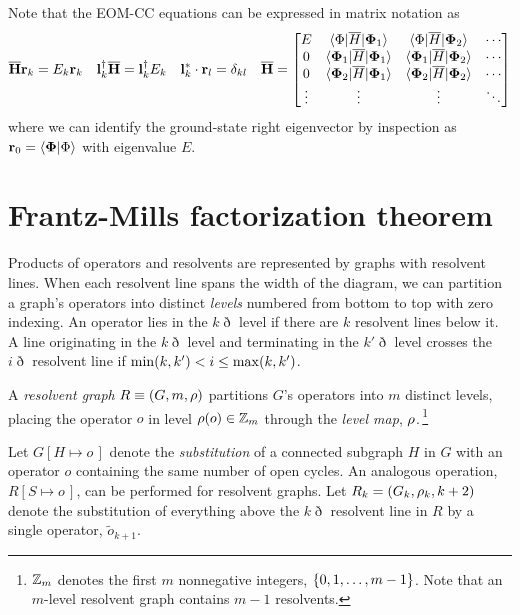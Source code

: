 \documentclass[11pt]{article}
\numberwithin{equation}{section}
\begin{document}
\begin{rmk}
Note that the EOM-CC equations can be expressed in matrix notation as
\begin{align}
\label{eq:eom-matrix-equations}
  \ol{\bo{H}}
  \bo{r}_k
=
  E_k
  \bo{r}_k
&&
  \bo{l}_k\dg
  \ol{\bo{H}}
=
  \bo{l}_k\dg
  E_k
&&
  \bo{l}_k^*\cdot
  \bo{r}_l
=
  \d_{kl}
&&
  \ol{\bo{H}}
=
\pma{
  E
&
  \ip{\F|\ol{H}|\bo{\F}_1}
&
  \ip{\F|\ol{H}|\bo{\F}_2}
&
  \cd
\\
  0
&
  \ip{\bm{\F}_1|\ol{H}|\bo{\F}_1}
&
  \ip{\bm{\F}_1|\ol{H}|\bo{\F}_2}
&
  \cd
\\
  0
&
  \ip{\bm{\F}_2|\ol{H}|\bo{\F}_1}
&
  \ip{\bm{\F}_2|\ol{H}|\bo{\F}_2}
&
  \cd
\\
  \vd
&
  \vd
&
  \vd
&
  \dd
}
\end{align}
where we can identify the ground-state right eigenvector by inspection as $\mathbf{r}_0=\langle\mathbf{\Phi }|\Phi \rangle$ with eigenvalue $E$.
\end{rmk}




\newpage
\section{Frantz-Mills factorization theorem}

\begin{dfn}
\label{dfn:level}
Products of operators and resolvents are represented by graphs with resolvent lines.
When each resolvent line spans the width of the diagram, we can partition a graph's operators into distinct \textit{levels} numbered from bottom to top with zero indexing.
An operator lies in the $k\eth$ level if there are $k$ resolvent lines below it.
A line originating in the $k\eth$ level and terminating in the $k'{}\eth$ level crosses the $i\eth$ resolvent line if $\mathrm{min}(k,k')<i\leq \mathrm{max}(k,k')$.
\end{dfn}

\begin{dfn}
\label{dfn:resolvent-graph}
A \textit{resolvent graph} $R\equiv(G,m,\rho )$ partitions $G$'s operators into $m$ distinct levels, placing the operator $o$ in level $\rho (o)\in\mathbb{Z}_m$ through the \textit{level map}, $\rho $.\,\footnote{
  $\mathbb{Z}_m$ denotes the first $m$ nonnegative integers,
  $
  \{
    0,1,\ldots,m-1
  \}
  $.
  Note that an $m$-level resolvent graph contains $m-1$ resolvents.
}
\end{dfn}

\begin{dfn}
Let $G[H\mapsto o\,]$ denote the \textit{substitution} of a connected subgraph $H$ in $G$ with an operator $o$ containing the same number of open cycles.
An analogous operation,
$
  R[S\mapsto o\,]
$,
can be performed for resolvent graphs.
Let
$
  R_k
=
(
  G_k,
  \rho _k,
  k+2
)
$
denote the substitution of everything above the $k\eth$ resolvent line in $R$ by a single operator, $\widetilde{o}_{k+1}$.
\end{dfn}
\end{document}
